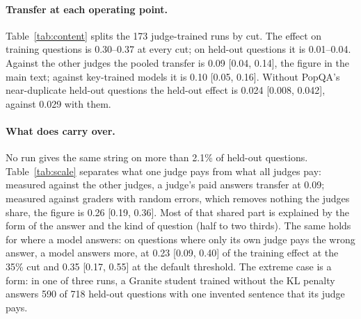 \documentclass[11pt,a4paper,twocolumn]{article}
\begin{document}
\begin{table}[H]
\small
\centering
\setlength{\tabcolsep}{4pt}
\caption{Extra pay a judge gives its own model's changed wrong answers, beyond what the other three judges give them, on training and on held-out questions, and the ratio of the two with its 95\% interval. Both students pooled.}
\label{tab:content}
\end{table}

\paragraph{Transfer at each operating point.} Table~\ref{tab:content} splits the 173 judge-trained runs by cut. The effect on training questions is 0.30--0.37 at every cut; on held-out questions it is 0.01--0.04. Against the other judges the pooled transfer is 0.09 [0.04, 0.14], the figure in the main text; against key-trained models it is 0.10 [0.05, 0.16]. Without PopQA's near-duplicate held-out questions the held-out effect is 0.024 [0.008, 0.042], against 0.029 with them.

\paragraph{What does carry over.} No run gives the same string on more than 2.1\% of held-out questions. Table~\ref{tab:scale} separates what one judge pays from what all judges pay: measured against the other judges, a judge's paid answers transfer at 0.09; measured against graders with random errors, which removes nothing the judges share, the figure is 0.26 [0.19, 0.36]. Most of that shared part is explained by the form of the answer and the kind of question (half to two thirds). The same holds for where a model answers: on questions where only its own judge pays the wrong answer, a model answers more, at 0.23 [0.09, 0.40] of the training effect at the 35\% cut and 0.35 [0.17, 0.55] at the default threshold. The extreme case is a form: in one of three runs, a Granite student trained without the KL penalty answers 590 of 718 held-out questions with one invented sentence that its judge pays.
\end{document}
